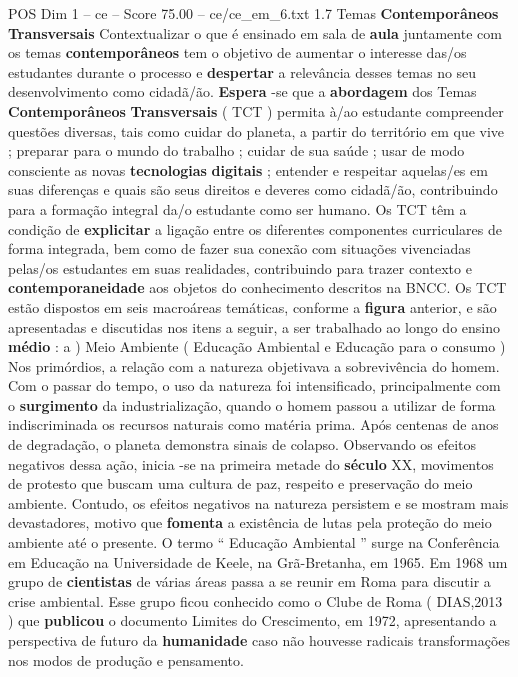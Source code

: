 \begin{textsample}{POS Dim 1 – ce – Score 75.00 – ce/ce\_em\_6.txt}  \label{ex:f1_pos_043}
1.7 Temas \textbf{Contemporâneos} \textbf{Transversais} Contextualizar o que é ensinado em sala de \textbf{aula} juntamente com os temas \textbf{contemporâneos} tem o objetivo de aumentar o interesse das/os estudantes durante o processo e \textbf{despertar} a relevância desses temas no seu desenvolvimento como cidadã/ão. \textbf{Espera} -se que a \textbf{abordagem} dos Temas \textbf{Contemporâneos} \textbf{Transversais} ( TCT ) permita à/ao estudante compreender questões diversas, tais como cuidar do planeta, a partir do território em que vive ; preparar para o mundo do trabalho ; cuidar de sua saúde ; usar de modo consciente as novas \textbf{tecnologias} \textbf{digitais} ; entender e respeitar aquelas/es em suas diferenças e quais são seus direitos e deveres como cidadã/ão, contribuindo para a formação integral da/o estudante como ser humano.
Os TCT têm a condição de \textbf{explicitar} a ligação entre os diferentes componentes curriculares de forma integrada, bem como de fazer sua conexão com situações vivenciadas pelas/os estudantes em suas realidades, contribuindo para trazer contexto e \textbf{contemporaneidade} aos objetos do conhecimento descritos na BNCC.
Os TCT estão dispostos em seis macroáreas temáticas, conforme a \textbf{figura} anterior, e são apresentadas e discutidas nos itens a seguir, a ser trabalhado ao longo do ensino \textbf{médio} : a ) Meio Ambiente ( Educação Ambiental e Educação para o consumo ) Nos primórdios, a relação com a natureza objetivava a sobrevivência do homem.
Com o passar do tempo, o uso da natureza foi intensificado, principalmente com o \textbf{surgimento} da industrialização, quando o homem passou a utilizar de forma indiscriminada os recursos naturais como matéria prima.
Após centenas de anos de degradação, o planeta demonstra sinais de colapso.
Observando os efeitos negativos dessa ação, inicia -se na primeira metade do \textbf{século} XX, movimentos de protesto que buscam uma cultura de paz, respeito e preservação do meio ambiente.
Contudo, os efeitos negativos na natureza persistem e se mostram mais devastadores, motivo que \textbf{fomenta} a existência de lutas pela proteção do meio ambiente até o presente.
O termo “ Educação Ambiental ” surge na Conferência em Educação na Universidade de Keele, na Grã-Bretanha, em 1965.
Em 1968 um grupo de \textbf{cientistas} de várias áreas passa a se reunir em Roma para discutir a crise ambiental.
Esse grupo ficou conhecido como o Clube de Roma ( DIAS,2013 ) que \textbf{publicou} o documento Limites do Crescimento, em 1972, apresentando a perspectiva de futuro da \textbf{humanidade} caso não houvesse radicais transformações nos modos de produção e pensamento.

\end{textsample}
